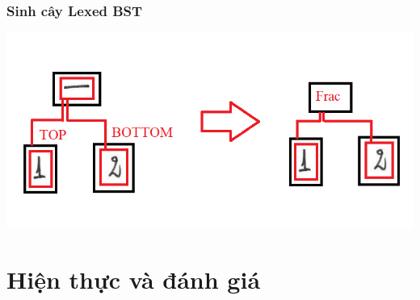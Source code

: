 \documentclass{beamer}
\begin{document}
	\begin{frame}
		\frametitle{Sinh cây Lexed BST}
		\begin{center}
			\centering
			\includegraphics[width=0.6\linewidth]{lex1.png}
		\end{center}
		
		
	\end{frame}
	
	
	
	
	
	
	
	
	\section{Hiện thực và đánh giá}
\end{document}
